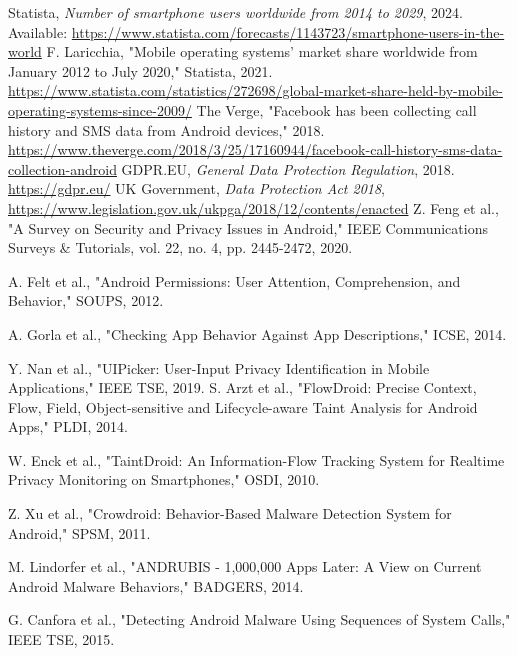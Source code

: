 \documentclass[a4paper,12pt]{report}
\begin{document}
\begin{thebibliography}{99}
     Statista, \textit{Number of smartphone users worldwide from 2014 to 2029}, 2024. Available: \url{https://www.statista.com/forecasts/1143723/smartphone-users-in-the-world}
     F. Laricchia, "Mobile operating systems’ market share worldwide from January 2012 to July 2020," Statista, 2021. \url{https://www.statista.com/statistics/272698/global-market-share-held-by-mobile-operating-systems-since-2009/}
     The Verge, "Facebook has been collecting call history and SMS data from Android devices," 2018. \url{https://www.theverge.com/2018/3/25/17160944/facebook-call-history-sms-data-collection-android}
     GDPR.EU, \textit{General Data Protection Regulation}, 2018. \url{https://gdpr.eu/}
     UK Government, \textit{Data Protection Act 2018}, \url{https://www.legislation.gov.uk/ukpga/2018/12/contents/enacted}
     Z. Feng et al., "A Survey on Security and Privacy Issues in Android," IEEE Communications Surveys \& Tutorials, vol. 22, no. 4, pp. 2445-2472, 2020.

     A. Felt et al., "Android Permissions: User Attention, Comprehension, and Behavior," SOUPS, 2012.

     A. Gorla et al., "Checking App Behavior Against App Descriptions," ICSE, 2014.

     Y. Nan et al., "UIPicker: User-Input Privacy Identification in Mobile Applications," IEEE TSE, 2019.
     S. Arzt et al., "FlowDroid: Precise Context, Flow, Field, Object-sensitive and Lifecycle-aware Taint Analysis for Android Apps," PLDI, 2014.

     W. Enck et al., "TaintDroid: An Information-Flow Tracking System for Realtime Privacy Monitoring on Smartphones," OSDI, 2010.

     Z. Xu et al., "Crowdroid: Behavior-Based Malware Detection System for Android," SPSM, 2011.

     M. Lindorfer et al., "ANDRUBIS - 1,000,000 Apps Later: A View on Current Android Malware Behaviors," BADGERS, 2014.

     G. Canfora et al., "Detecting Android Malware Using Sequences of System Calls," IEEE TSE, 2015.


\end{thebibliography}
\end{document}
